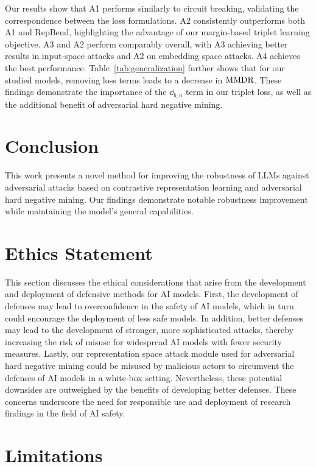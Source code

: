 \documentclass[11pt]{article}
\begin{document}
Our results show that A1 performs similarly to circuit breaking, validating the correspondence between the loss formulations.
A2 consistently outperforms both A1 and RepBend, highlighting the advantage of our margin-based triplet learning objective.
A3 and A2 perform comparably overall, with A3 achieving better results in input-space attacks
and A2 on embedding space attacks. A4 achieves the best performance.
Table~\ref{tab:generalization} further shows that for our studied models, removing loss terms leads to a decrease in $\text{MMDR}$. These findings demonstrate the importance of the $\dd_{b, n}$ term in our triplet loss, as well as the additional benefit of adversarial hard negative mining.

\section{Conclusion}
\label{sec:conclusion}

This work presents a novel method for improving the robustness of LLMs
against adversarial attacks based on contrastive representation learning and adversarial hard negative mining. Our findings demonstrate notable robustness improvement while
maintaining the model's general capabilities.

\section*{Ethics Statement}

This section discusses the ethical considerations that arise from the development and deployment of defensive methods for AI models.
First, the development of defenses may lead to overconfidence in the safety of AI models, which in turn could encourage the deployment of less safe models. In addition, better defenses
may lead to the development of stronger, more sophisticated attacks, thereby increasing the risk of misuse for widespread AI models with fewer security measures.
Lastly, our representation space attack module used for adversarial hard negative mining
could be misused by malicious actors to circumvent the defenses of AI models
in a white-box setting.
Nevertheless,
these potential downsides are outweighed by the
benefits of developing better defenses. These concerns underscore the need for responsible use and deployment of research findings in the field of AI safety.

\section*{Limitations}
\end{document}
